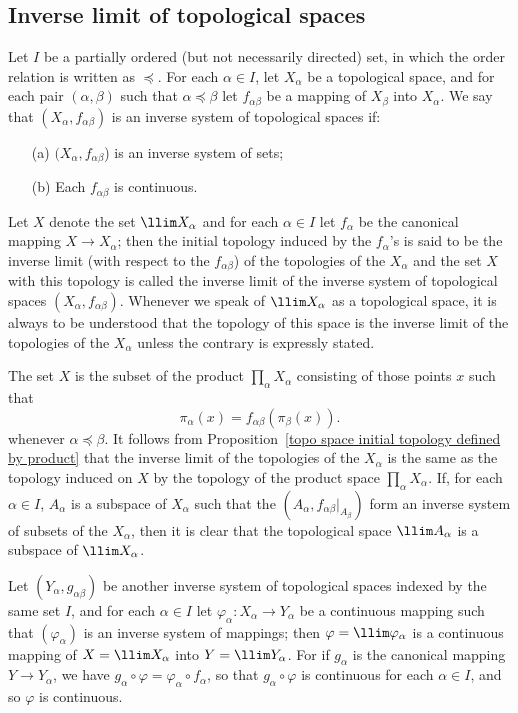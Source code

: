 \subsection{Inverse limit of topological spaces}
Let $I$ be a partially ordered (but not necessarily directed) set, in which the order relation is written as $\preceq$. For each $\alpha\in I$, let $X_\alpha$ be a topological space, and for each pair $(\alpha,\beta)$ such that $\alpha\preceq\beta$ let $f_{\alpha\beta}$ be a mapping of $X_\beta$ into $X_\alpha$. We say that $(X_\alpha,f_{\alpha\beta})$ is an inverse system of topological spaces if:
\begin{itemize}
\item[(a)] $(X_\alpha,f_{\alpha\beta}$) is an inverse system of sets;
\item[(b)] Each $f_{\alpha\beta}$ is continuous. 
\end{itemize} 
Let $X$ denote the set $\llim X_\alpha$ and for each $\alpha\in I$ let $f_\alpha$ be the canonical mapping $X\to X_\alpha$; then the initial topology induced by the $f_\alpha$'s is said to be the inverse limit (with respect to the $f_{\alpha\beta}$) of the topologies of the $X_\alpha$ and the set $X$ with this topology is called the inverse limit of the inverse system of topological spaces $(X_\alpha,f_{\alpha\beta})$. Whenever we speak of $\llim X_\alpha$ as a topological space, it is always to be understood that the topology of this space is the inverse limit of the topologies of the $X_\alpha$ unless the contrary is expressly stated.\par
The set $X$ is the subset of the product $\prod_{\alpha}X_\alpha$ consisting of those points $x$ such that
\[\pi_\alpha(x)=f_{\alpha\beta}(\pi_\beta(x)).\]
whenever $\alpha\preceq\beta$. It follows from Proposition~\ref{topo space initial topology defined by product} that the inverse limit of the topologies of the $X_\alpha$ is the same as the topology induced on $X$ by the topology of the product space $\prod_\alpha X_\alpha$. If, for each $\alpha\in I$, $A_\alpha$ is a subspace of $X_\alpha$ such that the $(A_\alpha,f_{\alpha\beta}|_{A_\beta})$ form an inverse system of subsets of the $X_\alpha$, then it is clear that the topological space $\llim A_\alpha$ is a subspace of $\llim X_\alpha$.\par
Let $(Y_\alpha,g_{\alpha\beta})$ be another inverse system of topological spaces indexed by the same set $I$, and for each $\alpha\in I$ let $\varphi_\alpha:X_\alpha\to Y_\alpha$ be a continuous mapping such that $(\varphi_\alpha)$ is an inverse system of mappings; then $\varphi=\llim \varphi_\alpha$ is a continuous mapping of $X=\llim X_\alpha$ into $Y=\llim Y_\alpha$. For if $g_\alpha$ is the canonical mapping $Y\to Y_\alpha$, we have $g_\alpha\circ\varphi=\varphi_\alpha\circ f_\alpha$, so that $g_\alpha\circ\varphi$ is continuous for each $\alpha\in I$, and so $\varphi$ is continuous.\par
